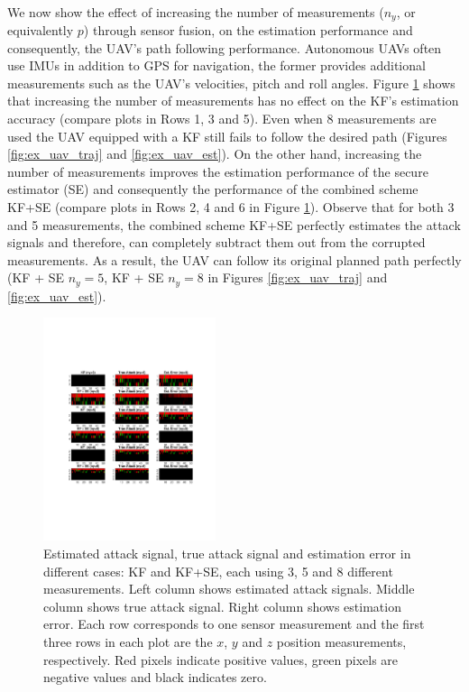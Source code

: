 \documentclass[../../thesis.tex]{subfiles}
\begin{document}
\\
We now show the effect of increasing the number of measurements ($n_y$, or equivalently $p$) through sensor fusion, on the estimation performance and consequently, the UAV's path following performance. Autonomous UAVs often use IMUs in addition to GPS for navigation, the former provides additional measurements such as the UAV's velocities, pitch and roll angles. Figure \ref{fig:ex_uav_error} shows that increasing the number of measurements has no effect on the KF's estimation accuracy (compare plots in Rows 1, 3 and 5). 
Even when 8 measurements are used the UAV equipped with a KF still fails to follow the desired path (Figures \ref{fig:ex_uav_traj} and \ref{fig:ex_uav_est}). On the other hand, increasing the number of measurements improves the estimation performance of the secure estimator (SE) and consequently the performance of the combined scheme KF+SE (compare plots in Rows 2, 4 and 6 in Figure  \ref{fig:ex_uav_error}). Observe that for both 3 and 5 measurements, the combined scheme KF+SE perfectly estimates the attack signals and therefore, can completely subtract them out from the corrupted measurements. As a result, the UAV can follow its original planned path perfectly (KF + SE $n_y=5$, KF + SE $n_y=8$ in Figures \ref{fig:ex_uav_traj} and \ref{fig:ex_uav_est}).
\begin{figure}
\center
\includegraphics[width=0.45\textwidth]{chapters/se_linear/figures/qh/uav_lqg_error}
\caption{Estimated attack signal, true attack signal and estimation error in different cases: KF and KF+SE, each using 3, 5 and 8 different measurements. Left column shows estimated attack signals. Middle column shows true attack signal. Right column shows estimation error. Each row corresponds to one sensor measurement and the first three rows in each plot are the $x$, $y$ and $z$ position measurements, respectively. Red pixels indicate positive values, green pixels are negative values and black indicates zero.}
\label{fig:ex_uav_error}
\end{figure}
\end{document}
